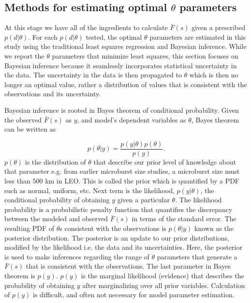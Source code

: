 \subsection{Methods for estimating optimal $\theta$ parameters}
At this stage we have all of the ingredients to calculate $\bar{F}(s)$ given a prescribed $p(d | \theta)$. For each $p(d | \theta)$ tested, the optimal $\theta$ parameters are estimated in this study using the traditional least squares regression and Bayesian inference. While we report the $\theta$ parameters that minimize least squares, this section focuses on Bayesian inference because it seamlessly incorporates statistical uncertainty in the data. The uncertainty in the data is then propagated to $\theta$ which is then no longer an optimal value, rather a distribution of values that is consistent with the observations and its uncertainty. 

Bayesian inference is rooted in Bayes theorem of conditional probability. Given the observed $\bar{F}(s)$ as $y$, and model's dependent variables as $\theta$, Bayes theorem can be written as

\begin{equation}
p(\theta | y) = \frac{p(y | \theta) p(\theta)}{p(y)}.
\end{equation} $p(\theta)$ is the distribution of $\theta$ that describe our prior level of knowledge about that parameter e.g. from earlier microburst size studies, a microburst size must less than $500$ km in LEO. This is called the prior which is quantified by a PDF such as normal, uniform, etc. Next term is the likelihood, $p(y | \theta)$, the conditional probability of obtaining $y$ given a particular $\theta$. The likelihood probability is a probabilistic penalty function that quantifies the discrepancy between the modeled and observed $\bar{F}(s)$ in terms of the standard error. The resulting PDF of $\theta$s consistent with the observations is $p(\theta | y)$ known as the posterior distribution. The posterior is an update to our prior distributions, modified by the likelihood i.e. the data and its uncertainties. Here, the posterior is used to make inferences regarding the range of $\theta$ parameters that generate a $\bar{F}(s)$ that is consistent with the observations. The last parameter in Bayes theorem is $p(y)$. $p(y)$ is the marginal likelihood (evidence) that describes the probability of obtaining $y$ after marginalizing over all prior variables. Calculation of $p(y)$ is difficult, and often not necessary for model parameter estimation. 

